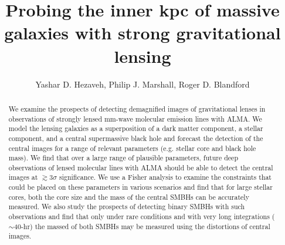 \documentclass[chicago]{emulateapj}
\begin{document}
\title{Probing the inner kpc of massive galaxies with strong gravitational lensing}
\author{Yashar D. Hezaveh, Philip J. Marshall, Roger D. Blandford}  

\begin{abstract}  
\noindent
We examine the prospects of detecting demagnified images of gravitational lenses in observations of strongly lensed mm-wave molecular emission lines with ALMA. We model the lensing galaxies as a superposition of a dark matter component, a stellar component, and a central supermassive black hole and forecast the detection of the central images for a range of relevant parameters (e.g. stellar core and black hole mass).
We find that over a large range of plausible parameters, future deep observations of lensed molecular lines with ALMA should be able to detect the central images at $\gtrsim 3\sigma$ significance. We use a Fisher analysis to examine the  constraints that could be placed on these parameters in various scenarios and find that for large stellar cores, both the core size and the mass of the central SMBHs can be accurately measured. We also study the prospects of detecting binary SMBHs with such observations and find that only under rare conditions and with very long integrations ($\sim$40-hr) the massed of both SMBHs may be measured using the distortions of central images.


\end{abstract}



\end{document}
